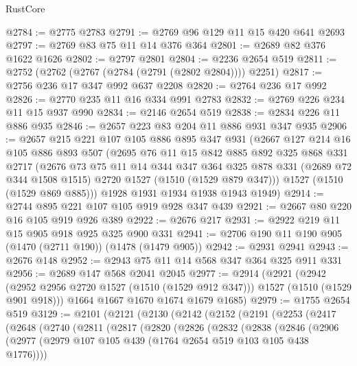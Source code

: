 \begin{lexlean}{RustCore}
\begin{coremodule}
@2784 := @2775 @2783
@2791 := @2769 @96 @129 @11 @15 @420 @641 @2693
@2797 := @2769 @83 @75 @11 @14 @376 @364
@2801 := @2689 @82 @376 @1622 @1626
@2802 := @2797 @2801
@2804 := @2236 @2654 @519
@2811 := @2752 (@2762 (@2767 (@2784 (@2791 (@2802 @2804)))) @2251)
@2817 := @2756 @236 @17 @347 @992 @637 @2208
@2820 := @2764 @236 @17 @992
@2826 := @2770 @235 @11 @16 @334 @991 @2783
@2832 := @2769 @226 @234 @11 @15 @937 @990
@2834 := @2146 @2654 @519
@2838 := @2834 @226 @11 @886 @935
@2846 := @2657 @223 @83 @204 @11 @886 @931 @347 @935
@2906 := @2657
    @215
    @221
    @107
    @105
    @886
    @895
    @347
    @931
    (@2667
      @127
      @214
      @16
      @105
      @886
      @893
      @507
      (@2695
        @76
        @11
        @15
        @842
        @885
        @892
        @325
        @868
        @331
        @2717
        (@2676
          @73
          @75
          @11
          @14
          @344
          @347
          @364
          @325
          @878
          @331
          (@2689 @72 @344 @1508 @1515)
          @2720
          @1527
          (@1510 (@1529 @879 @347)))
        @1527
        (@1510 (@1529 @869 @885)))
      @1928
      @1931
      @1934
      @1938
      @1943
      @1949)
@2914 := @2744 @895 @221 @107 @105 @919 @928 @347 @439
@2921 := @2667 @80 @220 @16 @105 @919 @926 @389
@2922 := @2676 @217
@2931 := @2922 @219 @11 @15 @905 @918 @925 @325 @900 @331
@2941 := @2706 @190 @11 @190 @905 (@1470 (@2711 @190)) (@1478 (@1479 @905))
@2942 := @2931 @2941
@2943 := @2676 @148
@2952 := @2943 @75 @11 @14 @568 @347 @364 @325 @911 @331
@2956 := @2689 @147 @568 @2041 @2045
@2977 := @2914
    (@2921
      (@2942 (@2952 @2956 @2720 @1527 (@1510 (@1529 @912 @347))) @1527 (@1510 (@1529 @901 @918)))
      @1664
      @1667
      @1670
      @1674
      @1679
      @1685)
@2979 := @1755 @2654 @519
@3129 := @2101
    (@2121
      (@2130
        (@2142
          (@2152
            (@2191
              (@2253
                (@2417
                  (@2648
                    (@2740
                      (@2811
                        (@2817
                          (@2820
                            (@2826
                              (@2832
                                (@2838
                                  (@2846
                                    (@2906
                                      (@2977
                                        (@2979
                                          @107
                                          @105
                                          @439
                                          (@1764 @2654 @519 @103 @105 @438 @1776))))

\end{coremodule}
\end{lexlean}
